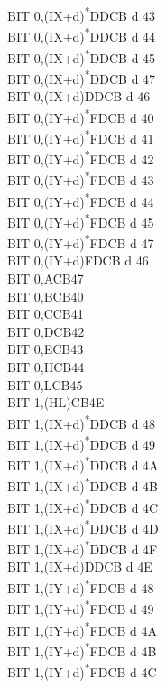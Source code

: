 \documentclass[twoside,openright,a4paper]{book}
\begin{document}
\begin{multicols}{3}
{\begin{tabbing}
	BIT 0,(IX+d)\textsuperscript{*}\>DDCB d 43\\
	BIT 0,(IX+d)\textsuperscript{*}\>DDCB d 44\\
	BIT 0,(IX+d)\textsuperscript{*}\>DDCB d 45\\
	BIT 0,(IX+d)\textsuperscript{*}\>DDCB d 47\\
	BIT 0,(IX+d)\>DDCB d 46\\
	BIT 0,(IY+d)\textsuperscript{*}\>FDCB d 40\\
	BIT 0,(IY+d)\textsuperscript{*}\>FDCB d 41\\
	BIT 0,(IY+d)\textsuperscript{*}\>FDCB d 42\\
	BIT 0,(IY+d)\textsuperscript{*}\>FDCB d 43\\
	BIT 0,(IY+d)\textsuperscript{*}\>FDCB d 44\\
	BIT 0,(IY+d)\textsuperscript{*}\>FDCB d 45\\
	BIT 0,(IY+d)\textsuperscript{*}\>FDCB d 47\\
	BIT 0,(IY+d)\>FDCB d 46\\
	BIT 0,A\>CB47\\
	BIT 0,B\>CB40\\
	BIT 0,C\>CB41\\
	BIT 0,D\>CB42\\
	BIT 0,E\>CB43\\
	BIT 0,H\>CB44\\
	BIT 0,L\>CB45\\
	BIT 1,(HL)\>CB4E\\
	BIT 1,(IX+d)\textsuperscript{*}\>DDCB d 48\\
	BIT 1,(IX+d)\textsuperscript{*}\>DDCB d 49\\
	BIT 1,(IX+d)\textsuperscript{*}\>DDCB d 4A\\
	BIT 1,(IX+d)\textsuperscript{*}\>DDCB d 4B\\
	BIT 1,(IX+d)\textsuperscript{*}\>DDCB d 4C\\
	BIT 1,(IX+d)\textsuperscript{*}\>DDCB d 4D\\
	BIT 1,(IX+d)\textsuperscript{*}\>DDCB d 4F\\
	BIT 1,(IX+d)\>DDCB d 4E\\
	BIT 1,(IY+d)\textsuperscript{*}\>FDCB d 48\\
	BIT 1,(IY+d)\textsuperscript{*}\>FDCB d 49\\
	BIT 1,(IY+d)\textsuperscript{*}\>FDCB d 4A\\
	BIT 1,(IY+d)\textsuperscript{*}\>FDCB d 4B\\
	BIT 1,(IY+d)\textsuperscript{*}\>FDCB d 4C\\

\end{tabbing}}
\end{multicols}
\end{document}
